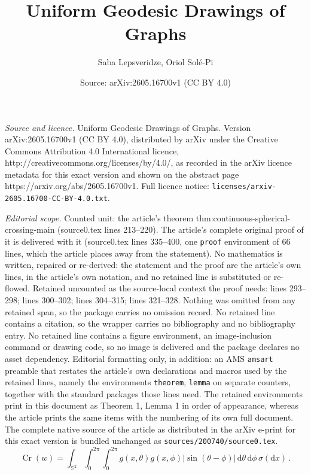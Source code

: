 \documentclass[10pt,a4paper]{amsart}
\title{Uniform Geodesic Drawings of Graphs}
\author{Saba Lepsveridze, Oriol Sol\'e-Pi}
\date{Source: arXiv:2605.16700v1 (CC BY 4.0)}
\newcommand{\abs}[1]{\left\lvert#1\right\rvert}
\newcommand{\dd}{\mathrm{d}}
\begin{document}
\maketitle

\noindent\emph{Source and licence.} Uniform Geodesic Drawings of Graphs. Version arXiv:2605.16700v1 (CC BY 4.0), distributed by arXiv under the Creative Commons Attribution 4.0 International licence, http://creativecommons.org/licenses/by/4.0/, as recorded in the arXiv licence metadata for this exact version and shown on the abstract page https://arxiv.org/abs/2605.16700v1. Full licence notice: \texttt{licenses/arxiv-2605.16700-CC-BY-4.0.txt}.\par\smallskip

\noindent\textit{Editorial scope.} Counted unit: the article's theorem thm:continuous-spherical-crossing-main (source0.tex lines 213--220). The article's complete original proof of it is delivered with it (source0.tex lines 335--400, one \texttt{proof} environment of 66 lines, which the article places away from the statement). No mathematics is written, repaired or re-derived: the statement and the proof are the article's own lines, in the article's own notation, and no retained line is substituted or re-flowed.  Retained uncounted as the source-local context the proof needs: lines 293--298; lines 300--302; lines 304--315; lines 321--328.  Nothing was omitted from any retained span, so the package carries no omission record.  No retained line contains a citation, so the wrapper carries no bibliography and no bibliography entry.  No retained line contains a figure environment, an image-inclusion command or drawing code, so no image is delivered and the package declares no asset dependency.  Editorial formatting only, in addition: an AMS \texttt{amsart} preamble that restates the article's own declarations and macros used by the retained lines, namely the environments \texttt{theorem}, \texttt{lemma} on separate counters, together with the standard packages those lines need.  The retained environments print in this document as Theorem 1, Lemma 1 in order of appearance, whereas the article prints the same items with the numbering of its own full document.  The complete native source of the article as distributed in the arXiv e-print for this exact version is bundled unchanged as \texttt{sources/200740/source0.tex}.
\begin{equation}\label{eq:normalized-flux-crossing-representation}
        \operatorname{Cr}(w)=
        \int_{{\mathbb S}^2}\int_0^{2\pi}\int_0^{2\pi}
        g(x,\theta)g(x,\phi)\abs{\sin(\theta-\phi)}
        \,\dd\theta\,\dd\phi\,\sigma(\dd x)\,.
\end{equation}
\end{document}
